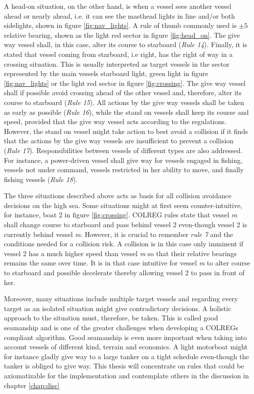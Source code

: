 A head-on situation, on the other hand, is when a vessel sees another vessel ahead or nearly ahead, i.e. it can see the masthead lights in line and/or both sidelights, shown in figure \ref{fig:nav_lights}. A rule of thumb commonly used is $\pm5$ \textdegree relative bearing, shown as the light red sector in figure \ref{fig:head_on}.
The give way vessel shall, in this case, alter its course to starboard (\textit{Rule 14}).
Finally, it is stated that vessel coming from starboard, i.e right, has the right of way in a crossing situation.
This is usually interpreted as target  vessels in the sector represented by the main vessels starboard light, green light in figure \ref{fig:nav_lights} or the light red sector in figure \ref{fig:crossing}.
The give way vessel shall if possible avoid crossing ahead of the other vessel and, therefore, alter its course to starboard  (\textit{Rule 15}).
All actions by the give way vessels shall be taken as early as possible  (\textit{Rule 16}), while the stand on vessels shall keep its course and speed, provided that the give way vessel acts according to the regulations.
However, the stand on vessel might take action to best avoid a collision if it finds that the actions by the give way vessels are insufficient to prevent a collision  (\textit{Rule 17}).
Responsibilities between vessels of different types are also addressed.
For instance, a power-driven vessel shall give way for vessels engaged in fishing,  vessels not under command,  vessels restricted in her ability to move, and finally fishing vessels   (\textit{Rule 18}).

The three situations described above acts as basis for all collision avoidance decisions on the high sea. Some situations might at first seem counter-intuitive, for instance, boat 2 in figure \ref{fig:crossing}. COLREG rules state that vessel \textit{m} shall change course to starboard and pass behind vessel 2 even-though vessel 2 is currently behind vessel \textit{m}. However, it is crucial to remember \textit{rule 7} and the conditions needed for a collision risk. A collision is in this case only imminent if vessel 2 has a much higher speed than vessel \textit{m} so that their relative bearings remains the same over time. It is in that case intuitive for vessel \textit{m} to alter course to starboard and possible decelerate thereby allowing vessel 2 to pass in front of her.

Moreover, many situations include multiple target vessels and regarding every target as an isolated situation might give contradictory decisions. A holistic approach to the situation must, therefore, be taken. This is called good seamanship and is one of the greater challenges when developing a COLREGs compliant algorithm. Good seamanship is even more important when taking into account vessels of different kind, terrain and economics. A light motorboat might for instance gladly give way to a large tanker on a tight schedule even-though the tanker is obliged to give way. This thesis will concentrate on rules that could be axiomatizable  for the implementation and contemplate others in the discussion in chapter \ref{chap:disc}

